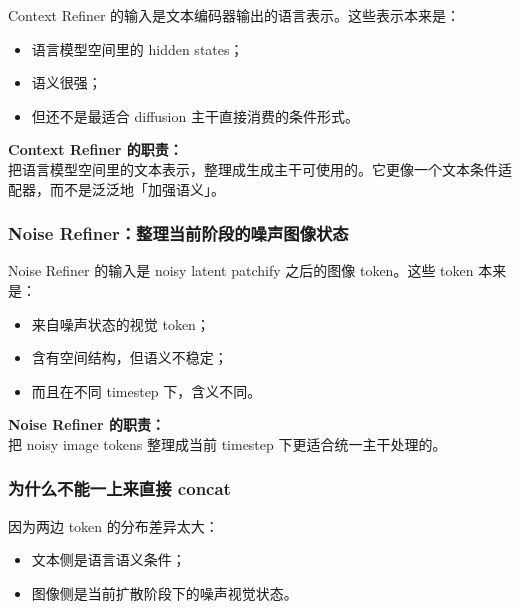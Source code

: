 Context Refiner 的输入是文本编码器输出的语言表示。这些表示本来是：

\begin{itemize}[leftmargin=1.5em]
  \item 语言模型空间里的 hidden states；
  \item 语义很强；
  \item 但还不是最适合 diffusion 主干直接消费的条件形式。
\end{itemize}

\begin{conceptbox}
\textbf{Context Refiner 的职责：}\\
把语言模型空间里的文本表示，整理成生成主干可使用的。它更像一个文本条件适配器，而不是泛泛地「加强语义」。
\end{conceptbox}

\subsubsection{Noise Refiner：整理当前阶段的噪声图像状态}

Noise Refiner 的输入是 noisy latent patchify 之后的图像 token。这些 token 本来是：

\begin{itemize}[leftmargin=1.5em]
  \item 来自噪声状态的视觉 token；
  \item 含有空间结构，但语义不稳定；
  \item 而且在不同 timestep 下，含义不同。
\end{itemize}

\begin{conceptbox}
\textbf{Noise Refiner 的职责：}\\
把 noisy image tokens 整理成当前 timestep 下更适合统一主干处理的。
\end{conceptbox}

\subsubsection{为什么不能一上来直接 concat}

因为两边 token 的分布差异太大：

\begin{itemize}[leftmargin=1.5em]
  \item 文本侧是语言语义条件；
  \item 图像侧是当前扩散阶段下的噪声视觉状态。
\end{itemize}

